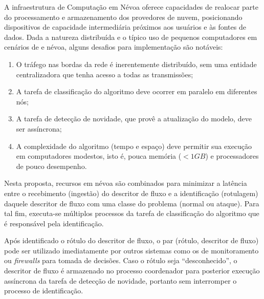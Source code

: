 A infraestrutura de Computação em Névoa oferece capacidades de realocar
parte do processamento e armazenamento dos provedores de nuvem, posicionando
dispositivos de capacidade intermediária próximos aos usuários e às fontes de dados.
Dada a natureza distribuída e o típico uso de pequenos computadores em cenários
de \iot e névoa, alguns desafios para implementação \nids são notáveis:
\begin{enumerate}[label=(\emph{\roman*})]

  \item O tráfego nas bordas da rede é inerentemente distribuído, sem uma
  entidade centralizadora que tenha acesso a todas as transmissões;
  
  \item A tarefa de classificação do algoritmo deve ocorrer em paralelo em
  diferentes nós;
  
  \item A tarefa de detecção de novidade, que provê a atualização do modelo,
  deve ser assíncrona;
    
  \item A complexidade do algoritmo (tempo e espaço) deve permitir sua execução em
  computadores modestos, isto é, pouca memória ($< 1GB$) e processadores de
  pouco desempenho.

\end{enumerate}

Nesta proposta, recursos em névoa são combinados para minimizar a latência entre
o recebimento (ingestão) do descritor de fluxo e a identificação (rotulagem)
daquele descritor de fluxo com uma classe do problema (normal ou ataque).
Para tal fim, executa-se múltiplos processos da tarefa de classificação do
algoritmo \minas que é responsável pela identificação.

Após identificado o rótulo do descritor de fluxo, o par (rótulo, descritor de fluxo)
pode ser utilizado imediatamente por outros sistemas como os de monitoramento ou
\emph{firewalls} para tomada de decisões.
Caso o rótulo seja ``desconhecido'', o descritor de fluxo é armazenado no
processo coordenador para
posterior execução assíncrona da tarefa
de detecção de novidade, portanto sem interromper o processo de identificação.

